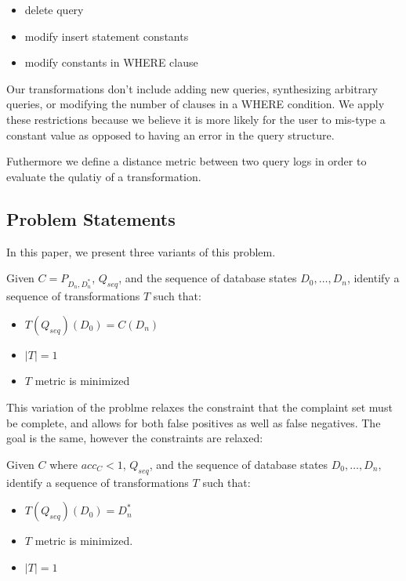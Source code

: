 \begin{itemize}
\item delete query
\item modify insert statement constants
\item modify constants in WHERE clause
\end{itemize}

Our transformations don't include adding new queries, synthesizing arbitrary queries, or modifying the
number of clauses in a WHERE condition.  We apply these restrictions because we believe it is more likely
for the user to mis-type a constant value as opposed to having an error in the query structure.

Futhermore we define a distance metric between two query logs in order to evaluate
the qulatiy of a transformation.



\subsection{Problem Statements}

In this paper, we present three variants of this problem.

\begin{problem}\label{prob:complete}
Given $C = P_{D_n, D^*_n}$, $Q_{seq}$, and the sequence of database states $D_0,\ldots,D_n$, 
identify a sequence of transformations $T$ such that:
\begin{itemize}
\item $T(Q_{seq})(D_0) = C(D_n)$
\item $|T| = 1$
\item $T$ metric is minimized
\end{itemize}
\end{problem}

This variation of the problme relaxes the constraint that the complaint set must be complete, and allows
for both false positives as well as false negatives.  The goal is the same, however the constraints are relaxed:

\begin{problem}\label{prob:incomplete}
Given $C$ where $acc_C < 1$, $Q_{seq}$, and the sequence of database states $D_0,\ldots,D_n$, 
identify a sequence of transformations $T$ such that:
\begin{itemize}
\item $T(Q_{seq})(D_0) = D^*_n$
\item $T$ metric is minimized.
\item $|T| = 1$
\end{itemize}
\end{problem}

